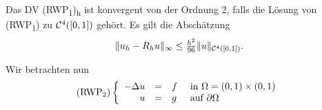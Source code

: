 \documentclass{cheat-sheet}
\newcommand{\Cont}{\mathcal{C}} %
\newcommand{\bOmega}{\partial \Omega} %
\newcommand{\Laplace}{\Delta}
\newcommand{\tss}[1]{\textsubscript{#1}} %
\begin{document}

\begin{satz}
  Das DV (RWP\tss{1})\tss{h} ist konvergent von der Ordnung 2, falls die Lösung von (RWP\tss{1}) zu $\Cont^4(\cinterval{0}{1})$ gehört.
  Es gilt die Abschätzung
  \[ \norm{u_h - R_h u}_\infty \leq \tfrac{h^2}{96} \norm{u}_{\Cont^4(\cinterval{0}{1})}. \]
\end{satz}


\begin{problem}
  Wir betrachten nun
  \[
    \text{(RWP\tss{2})} \left\{ \begin{array}{rlll}
      - \Laplace u &=& f &\text{ in $\Omega = \ointerval{0}{1} \times \ointerval{0}{1}$} \\
      u &=& g &\text{ auf $\bOmega$}
    \end{array} \right.
  \]
\end{problem}
\end{document}
